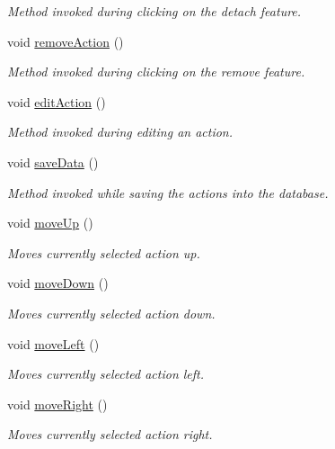 \begin{DoxyCompactItemize}
\begin{DoxyCompactList}\small\item\em Method invoked during clicking on the detach feature. \end{DoxyCompactList}\item 
void \hyperlink{classmain_win_a16012c30ebbfc2f89537df405f9662dc}{remove\-Action} ()
\begin{DoxyCompactList}\small\item\em Method invoked during clicking on the remove feature. \end{DoxyCompactList}\item 
void \hyperlink{classmain_win_ac891fd8165e421e0aafcc1fb3574df40}{edit\-Action} ()
\begin{DoxyCompactList}\small\item\em Method invoked during editing an action. \end{DoxyCompactList}\item 
void \hyperlink{classmain_win_a38e7757a0783951f6e0d2d35f6a95dcb}{save\-Data} ()
\begin{DoxyCompactList}\small\item\em Method invoked while saving the actions into the database. \end{DoxyCompactList}\item 
void \hyperlink{classmain_win_afdd988d05727d738cd482a8f1e07e3fe}{move\-Up} ()
\begin{DoxyCompactList}\small\item\em Moves currently selected action up. \end{DoxyCompactList}\item 
void \hyperlink{classmain_win_a92d52556b5fc642b7e39b2fad67640fc}{move\-Down} ()
\begin{DoxyCompactList}\small\item\em Moves currently selected action down. \end{DoxyCompactList}\item 
void \hyperlink{classmain_win_a6d480f5086986eaeeed93a4c3157f0df}{move\-Left} ()
\begin{DoxyCompactList}\small\item\em Moves currently selected action left. \end{DoxyCompactList}\item 
void \hyperlink{classmain_win_aa46d4ec0613b07140463723017711235}{move\-Right} ()
\begin{DoxyCompactList}\small\item\em Moves currently selected action right. \end{DoxyCompactList}\item 

\end{DoxyCompactItemize}
